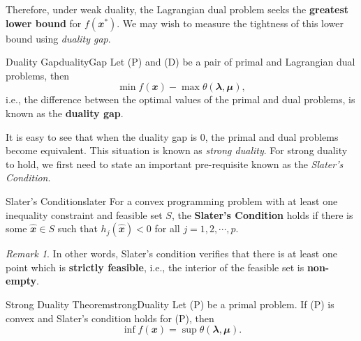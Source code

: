\documentclass[math, code]{amznotes}
\theoremstyle{remark}
\newtheorem*{remark}{Remark}
\begin{document}
Therefore, under weak duality, the Lagrangian dual problem seeks the \textbf{greatest lower bound} for $f(\mathbfit{x}^*)$. We may wish to measure the tightness of this lower bound using \textit{duality gap}.
\begin{dfnbox}{Duality Gap}{dualityGap}
    Let (P) and (D) be a pair of primal and Lagrangian dual problems, then
    \begin{equation*}
        \min f(\mathbfit{x}) - \max \theta(\mathbfit{\lambda}, \mathbfit{\mu}),
    \end{equation*}
    i.e., the difference between the optimal values of the primal and dual problems, is known as the {\color{red} \textbf{duality gap}}.
\end{dfnbox}
It is easy to see that when the duality gap is $0$, the primal and dual problems become equivalent. This situation is known as \textit{strong duality}. For strong duality to hold, we first need to state an important pre-requisite known as the \textit{Slater's Condition}.
\begin{dfnbox}{Slater's Condition}{slater}
    For a convex programming problem with at least one inequality constraint and feasible set $S$, the {\color{red} \textbf{Slater's Condition}} holds if there is some $\hat{\mathbfit{x}} \in S$ such that $h_j(\hat{\mathbfit{x}}) < 0$ for all $j = 1, 2, \cdots, p$.
\end{dfnbox}
\begin{notebox}
    \begin{remark}
        In other words, Slater's condition verifies that there is at least one point which is {\color{red} \textbf{strictly feasible}}, i.e., the interior of the feasible set is {\color{red} \textbf{non-empty}}.
    \end{remark}
\end{notebox}
\begin{thmbox}{Strong Duality Theorem}{strongDuality}
    Let (P) be a primal problem. If (P) is convex and Slater's condition holds for (P), then
    \begin{equation*}
        \inf f(\mathbfit{x}) = \sup \theta(\mathbfit{\lambda}, \mathbfit{\mu}).
    \end{equation*}
\end{thmbox}
\end{document}
